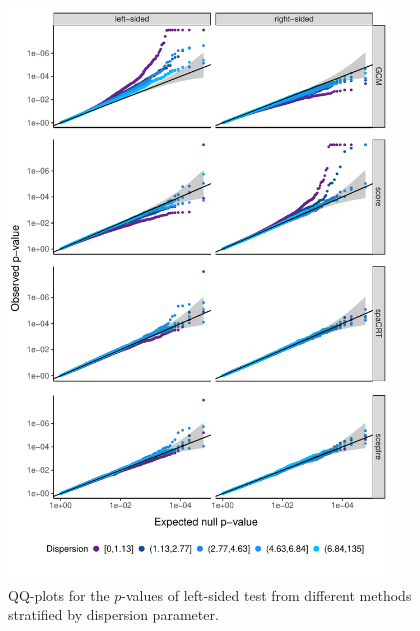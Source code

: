 \documentclass[12pt]{article}
\theoremstyle{definition}
\begin{document}
\begin{figure}[h!]
	\centering
	\includegraphics[width=0.9\textwidth]{figures-and-tables/facet_plot_different_withglmnb_dispersion.pdf}
	\caption{QQ-plots for the $p$-values of left-sided test from different methods stratified by dispersion parameter.}
	\label{fig:qqplot_dispersion}
\end{figure}
\end{document}
